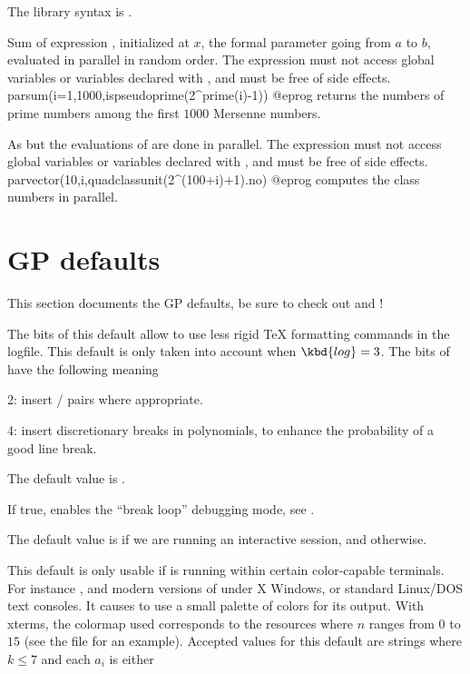 {The library syntax is .

\label{se:parsum}
Sum of expression , initialized at $x$, the formal parameter
going from $a$ to $b$, evaluated in parallel in random order.
The expression  must not access global variables or
variables declared with , and must be free of side effects.
\bprog
parsum(i=1,1000,ispseudoprime(2^prime(i)-1))
@eprog
returns the numbers of prime numbers among the first $1000$ Mersenne numbers.

\label{se:parvector}
As  but the evaluations of  are done in
parallel. The expression  must not access global variables or
variables declared with , and must be free of side effects.
\bprog
parvector(10,i,quadclassunit(2^(100+i)+1).no)
@eprog\noindent
computes the class numbers in parallel.

\section{GP defaults}
\label{se:gp_defaults} This section documents the GP defaults, be sure to
check out  and  !


\label{se:def,TeXstyle}
The bits of this default allow
 to use less rigid TeX formatting commands in the logfile. This
default is only taken into account when $\kbd{log} = 3$. The bits of
 have the following meaning

2: insert  /  pairs where appropriate.

4: insert discretionary breaks in polynomials, to enhance the probability of
a good line break.

The default value is .

\label{se:def,breakloop}
If true, enables the ``break loop'' debugging mode, see
.

The default value is  if we are running an interactive 
session, and  otherwise.

\label{se:def,colors}
This default is only usable if 
is running within certain color-capable terminals. For instance ,
 and modern versions of  under X Windows, or
standard Linux/DOS text consoles. It causes  to use a small palette of
colors for its output. With xterms, the colormap used corresponds to the
resources  where $n$ ranges from $0$ to $15$ (see the
file  for an example). Accepted values for this
default are strings  where $k\le7$ and each
$a_i$ is either

}
